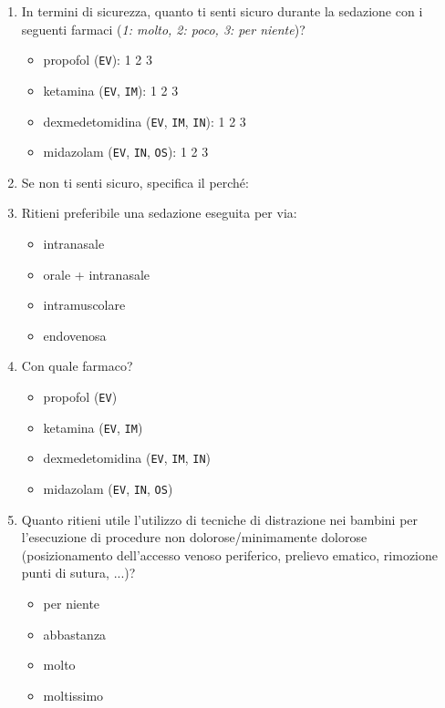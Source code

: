 \begin{enumerate}
           \item In termini di sicurezza, quanto ti senti sicuro durante la sedazione con i seguenti farmaci (\emph{1: molto, 2: poco, 3: per niente})?
           \begin{itemize}
               \item propofol (\texttt{EV}): 1 2 3
               \item ketamina (\texttt{EV}, \texttt{IM}): 1 2 3
               \item dexmedetomidina (\texttt{EV}, \texttt{IM}, \texttt{IN}): 1 2 3
               \item midazolam (\texttt{EV}, \texttt{IN}, \texttt{OS}): 1 2 3
           \end{itemize}
           
           \item Se non ti senti sicuro, specifica il perché:
           \item Ritieni preferibile una sedazione eseguita per via:
           \begin{itemize}
               \item intranasale
               \item orale + intranasale
               \item intramuscolare
               \item endovenosa
           \end{itemize}
           
           \item Con quale farmaco?
            \begin{itemize}
               \item propofol (\texttt{EV})
               \item ketamina (\texttt{EV}, \texttt{IM})
               \item dexmedetomidina (\texttt{EV}, \texttt{IM}, \texttt{IN})
               \item midazolam (\texttt{EV}, \texttt{IN}, \texttt{OS})
           \end{itemize}
           
           \item Quanto ritieni utile l’utilizzo di tecniche di distrazione nei bambini per l’esecuzione di procedure non dolorose/minimamente dolorose (posizionamento dell'accesso venoso periferico, prelievo ematico, rimozione punti di sutura, ...)?
           \begin{itemize}
               \item per niente
               \item abbastanza
               \item molto
               \item moltissimo
           \end{itemize}
           

\end{enumerate}
